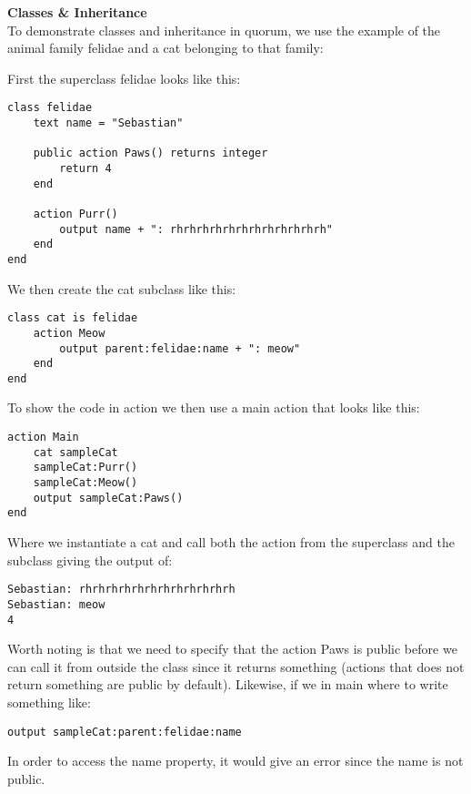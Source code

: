 \textbf{Classes \& Inheritance}\\
To demonstrate classes and inheritance in quorum, we use the example of the animal family felidae and a cat belonging to that family:

First the superclass felidae looks like this:

\begin{lstlisting}[language=Quorum]
class felidae 
    text name = "Sebastian"

    public action Paws() returns integer
        return 4
    end

    action Purr()
        output name + ": rhrhrhrhrhrhrhrhrhrhrhrh"
    end
end
\end{lstlisting}

We then create the cat subclass like this:

\begin{lstlisting}[language=Quorum]
class cat is felidae
    action Meow
        output parent:felidae:name + ": meow"
    end
end
\end{lstlisting}

To show the code in action we then use a main action that looks like this:

\begin{lstlisting}[language=Quorum]
action Main
    cat sampleCat
    sampleCat:Purr()
    sampleCat:Meow()
    output sampleCat:Paws()
end
\end{lstlisting}

Where we instantiate a cat and call both the action from the superclass and the subclass giving the output of: 

\lstinline!Sebastian: rhrhrhrhrhrhrhrhrhrhrhrh!\\
\lstinline!Sebastian: meow!\\
\lstinline!4!

Worth noting is that we need to specify that the action Paws is public before we can call it from outside the class since it returns something (actions that does not return something are public by default). Likewise, if we in main where to write something like:

\begin{lstlisting}[language=Quorum]
output sampleCat:parent:felidae:name
\end{lstlisting}

In order to access the name property, it would give an error since the name is not public.

